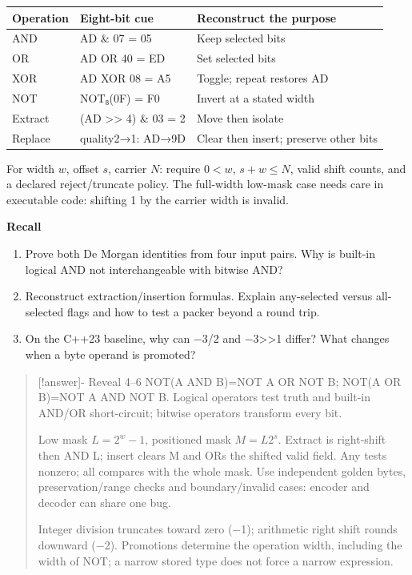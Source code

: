 {\def\LTcaptype{none} %
\begin{longtable}[]{@{}lll@{}}
\toprule\noalign{}
Operation & Eight-bit cue & Reconstruct the purpose \\
\midrule\noalign{}
\endhead
\bottomrule\noalign{}
\endlastfoot
AND & AD \& 07 = 05 & Keep selected bits \\
OR & AD OR 40 = ED & Set selected bits \\
XOR & AD XOR 08 = A5 & Toggle; repeat restores AD \\
NOT & NOT₈(0F) = F0 & Invert at a stated width \\
Extract & (AD \textgreater\textgreater{} 4) \& 03 = 2 & Move then isolate \\
Replace & quality2→1: AD→9D & Clear then insert; preserve other bits \\
\end{longtable}
}

For width \(w\), offset \(s\), carrier \(N\): require \(0<w\), \(s+w\le N\), valid shift counts, and a declared reject/truncate policy. The full-width low-mask case needs care in executable code: shifting 1 by the carrier width is invalid.

\textbf{Recall}

\begin{enumerate}
\def\labelenumi{\arabic{enumi}.}
\setcounter{enumi}{3}
\tightlist
\item
  Prove both De Morgan identities from four input pairs. Why is built-in logical AND not interchangeable with bitwise AND?
\item
  Reconstruct extraction/insertion formulas. Explain any-selected versus all-selected flags and how to test a packer beyond a round trip.
\item
  On the C++23 baseline, why can −3/2 and −3\textgreater\textgreater1 differ? What changes when a byte operand is promoted?
\end{enumerate}

\begin{quote}
{[}!answer{]}- Reveal 4--6 NOT(A AND B)=NOT A OR NOT B; NOT(A OR B)=NOT A AND NOT B. Logical operators test truth and built-in AND/OR short-circuit; bitwise operators transform every bit.

Low mask \(L=2^w-1\), positioned mask \(M=L2^s\). Extract is right-shift then AND L; insert clears M and ORs the shifted valid field. Any tests nonzero; all compares with the whole mask. Use independent golden bytes, preservation/range checks and boundary/invalid cases: encoder and decoder can share one bug.

Integer division truncates toward zero (−1); arithmetic right shift rounds downward (−2). Promotions determine the operation width, including the width of NOT; a narrow stored type does not force a narrow expression.
\end{quote}

